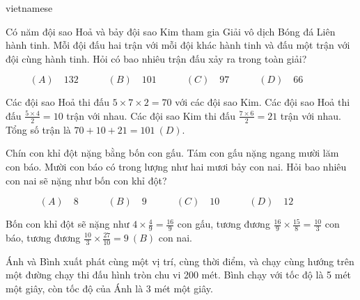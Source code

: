 \documentclass{article}
\begin{document}
\begin{otherlanguage*}{vietnamese}
\bigbreak

\begin{problem*}[PI-2024-C-P27]
    \label{problem:pi-2024-c-p27}

    Có năm đội sao Hoả và bảy đội sao Kim tham gia Giải vô dịch Bóng đá Liên hành tinh.
    Mỗi đội đấu hai trận với mỗi đội khác hành tinh và đấu một trận với đội cùng hành tinh.
    Hỏi có bao nhiêu trận đấu xảy ra trong toàn giải?

    \[
        (A) \quad 132 \qquad \quad
        (B) \quad 101 \qquad \quad
        (C) \quad 97 \qquad \quad
        (D) \quad 66 \qquad \quad
    \]
\end{problem*}

\begin{soln}
    Các đội sao Hoả thi đấu $5 \times 7 \times 2 = 70$ với các đội sao Kim.
    Các đội sao Hoả thi đấu $\frac{5 \times 4}{2} = 10$ trận với nhau.
    Các đội sao Kim thi đấu $\frac{7 \times 6}{2} = 21$ trận với nhau.
    Tổng số trận là $70+10+21=\boxed{101\ (D).}$
\end{soln}

\bigbreak

\begin{problem*}[PI-2024-C-P28]
    \label{problem:pi-2024-c-p28}

    Chín con khỉ đột nặng bằng bốn con gấu. Tám con gấu nặng ngang mười lăm con báo.
    Mười con báo có trong lượng như hai mươi bảy con nai.
    Hỏi bao nhiêu con nai sẽ nặng như bốn con khỉ đột? 

    \[
        (A) \quad 8 \qquad \quad
        (B) \quad 9 \qquad \quad
        (C) \quad 10 \qquad \quad
        (D) \quad 12 \qquad \quad
    \]
\end{problem*}

\begin{soln}
    Bốn con khỉ đột sẽ nặng như $4 \times \frac{4}{9} = \frac{16}{9}$ con gấu,
    tương đương $\frac{16}{9} \times \frac{15}{8}  = \frac{10}{3}$ con báo,
    tương đương $\frac{10}{3} \times \frac{27}{10}  = \boxed{9\ (B)}$ con nai.
\end{soln}

\bigbreak

\begin{problem*}[PI-2024-C-P29]
    \label{problem:pi-2024-c-p29}

    Ánh và Bình xuất phát cùng một vị trí, cùng thời điểm, và chạy cùng hướng trên một đường chạy thi đấu hình tròn chu vi 200 mét.
    Bình chạy với tốc độ là 5 mét một giây, còn tốc độ của Ánh là 3 mét một giây.


\end{problem*}
\end{otherlanguage*}
\end{document}
